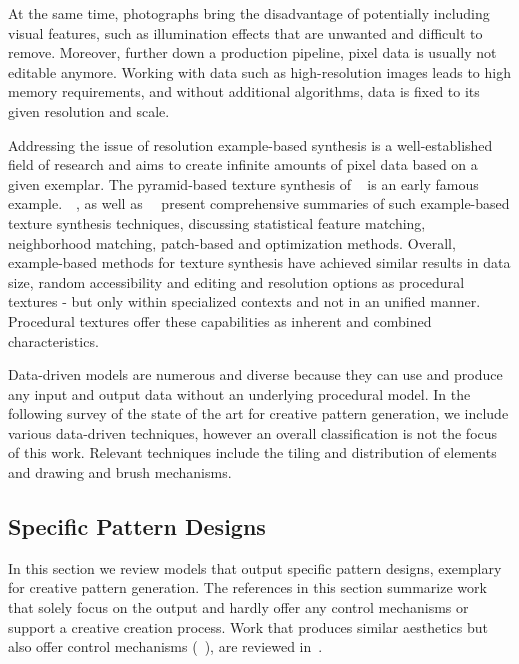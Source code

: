 At the same time, photographs bring the disadvantage of potentially including visual features, such as illumination effects that are unwanted and difficult to remove. Moreover, further down a production pipeline, pixel data is usually not editable anymore. Working with data such as high-resolution images leads to high memory requirements, and without additional algorithms, data is fixed to its given resolution and scale.

Addressing the issue of resolution example-based synthesis is a well-established field of research and aims to create infinite amounts of pixel data based on a given exemplar. The pyramid-based texture synthesis of \citeauthor*{heeger_1995_pbt}~\cite{heeger_1995_pbt} is an early famous example.~\citeauthor*{wei_2009_seb}~\cite{wei_2009_seb}, as well as~\citeauthor*{barnes_2017_aso}~\cite{barnes_2017_aso} present comprehensive summaries of such example-based texture synthesis techniques, discussing statistical feature matching, neighborhood matching, patch-based and optimization methods. Overall, example-based methods for texture synthesis have achieved similar results in data size, random accessibility and editing and resolution options as procedural textures - but only within specialized contexts and not in an unified manner. Procedural textures offer these capabilities as inherent and combined characteristics.

Data-driven models are numerous and diverse because they can use and produce any input and output data without an underlying procedural model. In the following survey of the state of the art for creative pattern generation, we include various data-driven techniques, however an overall classification is not the focus of this work. Relevant techniques include the tiling and distribution of elements and drawing and brush mechanisms.



\subsection{Specific Pattern Designs}
\label{subsec:specific_pattern_designs}

In this section we review models that output specific pattern designs, exemplary for creative pattern generation. The references in this section summarize work that solely focus on the output and hardly offer any control mechanisms or support a creative creation process. Work that produces similar aesthetics but also offer control mechanisms (\eg~\cite{wong_1998_cgf,yu_2012_ans,zehnder_2016_dso}), are reviewed in~.

